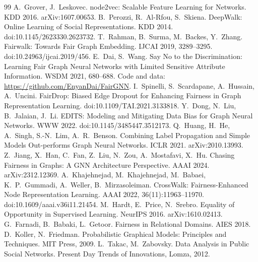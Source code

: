 \documentclass[11pt,a4paper]{article}
\begin{document}
\begin{thebibliography}{99}\small
{} A.~Grover, J.~Leskovec. node2vec: Scalable Feature Learning for Networks. KDD 2016. arXiv:1607.00653.
 B.~Perozzi, R.~Al-Rfou, S.~Skiena. DeepWalk: Online Learning of Social Representations. KDD 2014. doi:10.1145/2623330.2623732.
 T.~Rahman, B.~Surma, M.~Backes, Y.~Zhang. Fairwalk: Towards Fair Graph Embedding. IJCAI 2019, 3289--3295. doi:10.24963/ijcai.2019/456.
 E.~Dai, S.~Wang. Say No to the Discrimination: Learning Fair Graph Neural Networks with Limited Sensitive Attribute Information. WSDM 2021, 680--688. Code and data: \url{https://github.com/EnyanDai/FairGNN}.
 I.~Spinelli, S.~Scardapane, A.~Hussain, A.~Uncini. FairDrop: Biased Edge Dropout for Enhancing Fairness in Graph Representation Learning. doi:10.1109/TAI.2021.3133818.
 Y.~Dong, N.~Liu, B.~Jalaian, J.~Li. EDITS: Modeling and Mitigating Data Bias for Graph Neural Networks. WWW 2022. doi:10.1145/3485447.3512173.
 Q.~Huang, H.~He, A.~Singh, S.-N.~Lim, A.~R.~Benson. Combining Label Propagation and Simple Models Out-performs Graph Neural Networks. ICLR 2021. arXiv:2010.13993.
 Z.~Jiang, X.~Han, C.~Fan, Z.~Liu, N.~Zou, A.~Mostafavi, X.~Hu. Chasing Fairness in Graphs: A GNN Architecture Perspective. AAAI 2024. arXiv:2312.12369.
 A.~Khajehnejad, M.~Khajehnejad, M.~Babaei, K.~P.~Gummadi, A.~Weller, B.~Mirzasoleiman. CrossWalk: Fairness-Enhanced Node Representation Learning. AAAI 2022, 36(11):11963--11970. doi:10.1609/aaai.v36i11.21454.
 M.~Hardt, E.~Price, N.~Srebro. Equality of Opportunity in Supervised Learning. NeurIPS 2016. arXiv:1610.02413.
 G.~Farnadi, B.~Babaki, L.~Getoor. Fairness in Relational Domains. AIES 2018.
 D.~Koller, N.~Friedman. Probabilistic Graphical Models: Principles and Techniques. MIT Press, 2009.
 L.~Takac, M.~Zabovsky. Data Analysis in Public Social Networks. Present Day Trends of Innovations, Lomza, 2012.
\end{thebibliography}

\appendix
\end{document}
